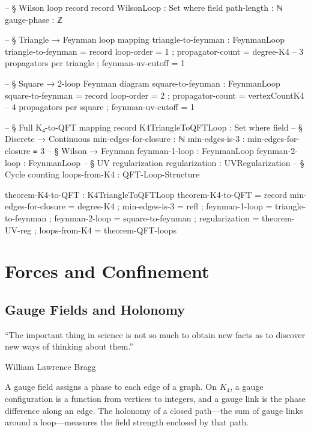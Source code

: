 \documentclass[11pt,a4paper]{book}
\begin{document}
\begin{code}
-- § Wilson loop record
record WilsonLoop : Set where
  field
    path-length  : ℕ
    gauge-phase  : ℤ

-- § Triangle → Feynman loop mapping
triangle-to-feynman : FeynmanLoop
triangle-to-feynman = record
  { loop-order       = 1
  ; propagator-count = degree-K4    -- 3 propagators per triangle
  ; feynman-uv-cutoff = 1 }

-- § Square → 2-loop Feynman diagram
square-to-feynman : FeynmanLoop
square-to-feynman = record
  { loop-order       = 2
  ; propagator-count = vertexCountK4  -- 4 propagators per square
  ; feynman-uv-cutoff = 1 }

-- § Full K₄-to-QFT mapping
record K4TriangleToQFTLoop : Set where
  field
    -- § Discrete → Continuous
    min-edges-for-closure : ℕ
    min-edges-is-3        : min-edges-for-closure ≡ 3
    -- § Wilson → Feynman
    feynman-1-loop        : FeynmanLoop
    feynman-2-loop        : FeynmanLoop
    -- § UV regularization
    regularization        : UVRegularization
    -- § Cycle counting
    loops-from-K4         : QFT-Loop-Structure

theorem-K4-to-QFT : K4TriangleToQFTLoop
theorem-K4-to-QFT = record
  { min-edges-for-closure = degree-K4
  ; min-edges-is-3        = refl
  ; feynman-1-loop        = triangle-to-feynman
  ; feynman-2-loop        = square-to-feynman
  ; regularization        = theorem-UV-reg
  ; loops-from-K4         = theorem-QFT-loops }
\end{code}

\part{Forces and Confinement}
\label{part:forces-confinement}

\chapter{Gauge Fields and Holonomy}
\label{ch:gauge-fields}

\epigraph{``The important thing in science is not so much to obtain new facts as to discover new ways of thinking about them.''}{William Lawrence Bragg}

A gauge field assigns a phase to each edge of a graph. On $K_4$, a gauge configuration is a function from vertices to integers, and a gauge link is the phase difference along an edge. The holonomy of a closed path---the sum of gauge links around a loop---measures the field strength enclosed by that path.
\end{document}
